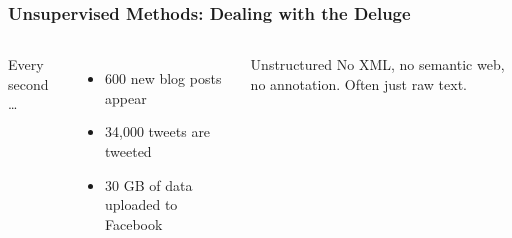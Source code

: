 \documentclass[compress]{beamer}
\begin{document}
\begin{frame}
\frametitle{Unsupervised Methods: Dealing with the Deluge}

\begin{columns}


Every second \dots
\begin{itemize}
  \item 600 new blog posts appear
  \item 34,000 tweets are tweeted
  \item 30 GB of data uploaded to Facebook
\end{itemize}
\pause

\begin{block}{Unstructured}
  No XML, no semantic web, no annotation.  Often just raw text.
\end{block}



\end{columns}

\end{frame}
\end{document}

